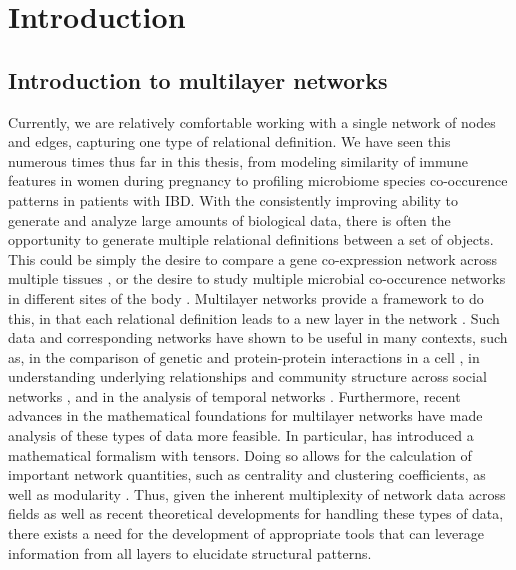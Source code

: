 \section{Introduction}
\subsection{Introduction to multilayer networks}
Currently, we are relatively comfortable working with a single network of nodes and edges, capturing one type of relational definition. We have seen this numerous times thus far in this thesis, from modeling similarity of immune features in women during pregnancy to profiling microbiome species co-occurence patterns in patients with IBD. With the consistently improving ability to generate and analyze large amounts of biological data, there is often the opportunity to generate multiple relational definitions between a set of objects. This could be simply the desire to compare a gene co-expression network across multiple tissues \cite{ohmNet}, or the desire to study multiple microbial co-occurence networks in different sites of the body \cite{microbiome}. Multilayer networks provide a framework to do this, in that each relational definition leads to a new layer in the network \cite{kivelamultilayer,boccaletti2014structure,manlioMathFoundations}.  Such data and corresponding networks have shown to be useful in many contexts, such as, in the comparison of genetic and protein-protein interactions in a cell \cite{genetic}, in understanding underlying relationships and community structure across social networks \cite{socialnetwork}, and in the analysis of temporal networks \cite{muchamultislice}. Furthermore, recent advances in the mathematical foundations for multilayer networks have made analysis of these types of data more feasible. In particular, \cite{manlioMathFoundations} has introduced a mathematical formalism with tensors. Doing so allows for the calculation of important network quantities, such as centrality and clustering coefficients, as well as modularity \cite{muchamultislice}. Thus, given the inherent multiplexity of network data across fields as well as recent theoretical developments for handling these types of data, there exists a need for the development of appropriate tools that can leverage information from all layers to elucidate structural patterns.


